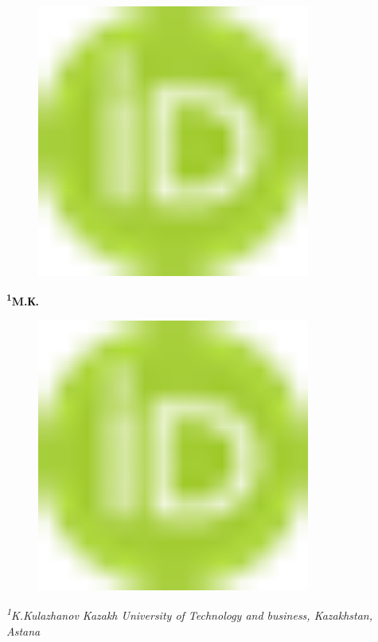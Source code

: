 {\begin{figure}[H]
	\centering
	\includegraphics[width=0.8\textwidth]{media/ekon/image1}
	\caption*{}
\end{figure}


{\bfseries \textsuperscript{1}M.К.
\begin{figure}[H]
	\centering
	\includegraphics[width=0.8\textwidth]{media/ekon/image1}
	\caption*{}
\end{figure}


\emph{\textsuperscript{1}K.Kulazhanov Kazakh University of Technology
and business, Kazakhstan, Astana}

}}

